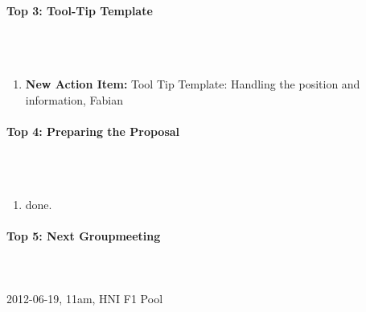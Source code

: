 \documentclass{scrartcl}
\begin{document}
\paragraph{Top 3: Tool-Tip Template}
\hfill \\ \hfill \\
\begin {enumerate}
\item \textbf{New Action Item:} Tool Tip Template: Handling the position and information, Fabian 
\end {enumerate}

\paragraph{Top 4: Preparing the Proposal}
\hfill \\ \hfill \\
\begin {enumerate}
\item done.
\end {enumerate}

\paragraph{Top 5: Next Groupmeeting}
\hfill \\ \hfill \\
2012-06-19, 11am, HNI F1 Pool
\end{document}
